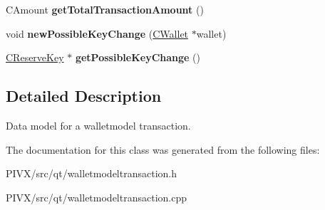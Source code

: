 \begin{DoxyCompactItemize}
C\+Amount {\bfseries get\+Total\+Transaction\+Amount} ()
\item 
\mbox{\label{class_wallet_model_transaction_af6e3adde528f4578145be97699c45bb8}} 
void {\bfseries new\+Possible\+Key\+Change} (\mbox{\hyperlink{class_c_wallet}{C\+Wallet}} $\ast$wallet)
\item 
\mbox{\label{class_wallet_model_transaction_a58835446dab9397f823106d4a6ba6812}} 
\mbox{\hyperlink{class_c_reserve_key}{C\+Reserve\+Key}} $\ast$ {\bfseries get\+Possible\+Key\+Change} ()
\end{DoxyCompactItemize}


\subsection{Detailed Description}
Data model for a walletmodel transaction. 

The documentation for this class was generated from the following files\+:\begin{DoxyCompactItemize}
\item 
P\+I\+V\+X/src/qt/walletmodeltransaction.\+h\item 
P\+I\+V\+X/src/qt/walletmodeltransaction.\+cpp\end{DoxyCompactItemize}
